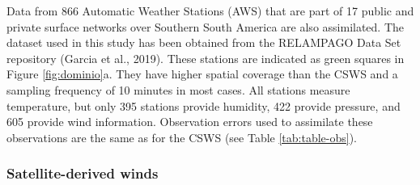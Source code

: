 \documentclass[12pt,twoside]{reedthesis}
\begin{document}
Data from 866 Automatic Weather Stations (AWS) that are part of 17 public and private surface networks over Southern South America are also assimilated. The dataset used in this study has been obtained from the RELAMPAGO Data Set repository (Garcia et al., 2019). These stations are indicated as green squares in Figure \ref{fig:dominio}a. They have higher spatial coverage than the CSWS and a sampling frequency of 10 minutes in most cases. All stations measure temperature, but only 395 stations provide humidity, 422 provide pressure, and 605 provide wind information.
Observation errors used to assimilate these observations are the same as for the CSWS (see Table \ref{tab:table-obs}).

\hypertarget{satellite-derived-winds}{%
\subsubsection{Satellite-derived winds}\label{satellite-derived-winds}}
\end{document}
